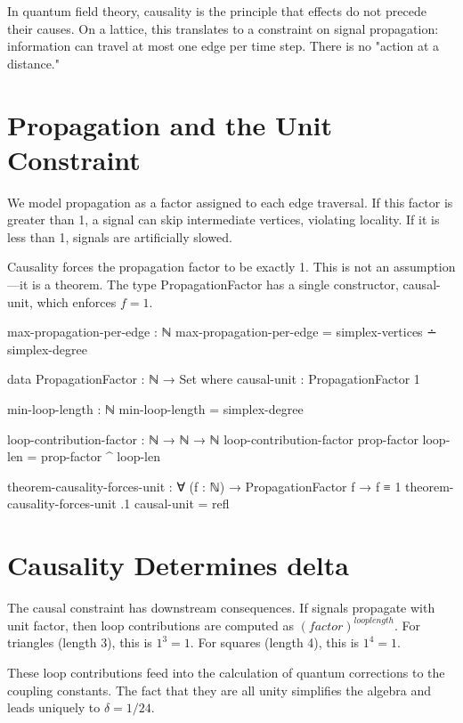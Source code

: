 \documentclass[11pt,a4paper]{book}
\def\texttt#1{#1}%
\def\text#1{#1}%
\def\texorpdfstring#1#2{#2}%
\begin{document}
In quantum field theory, causality is the principle that effects do not precede their causes. 
On a lattice, this translates to a constraint on signal propagation: information can travel 
at most one edge per time step. There is no "action at a distance."

\section{Propagation and the Unit Constraint}

We model propagation as a factor assigned to each edge traversal. If this factor is greater 
than 1, a signal can skip intermediate vertices, violating locality. If it is less than 1, 
signals are artificially slowed.

Causality forces the propagation factor to be exactly 1. This is not an assumption—it is a 
theorem. The type \texttt{PropagationFactor} has a single constructor, \texttt{causal-unit}, 
which enforces $f = 1$.

\begin{code}
max-propagation-per-edge : ℕ
max-propagation-per-edge = simplex-vertices ∸ simplex-degree

data PropagationFactor : ℕ → Set where
  causal-unit : PropagationFactor 1

min-loop-length : ℕ
min-loop-length = simplex-degree

loop-contribution-factor : ℕ → ℕ → ℕ
loop-contribution-factor prop-factor loop-len = prop-factor ^ loop-len

theorem-causality-forces-unit : ∀ (f : ℕ) → 
  PropagationFactor f → f ≡ 1
theorem-causality-forces-unit .1 causal-unit = refl
\end{code}

\section{Causality Determines \texorpdfstring{$\delta$}{delta}}

The causal constraint has downstream consequences. If signals propagate with unit factor, 
then loop contributions are computed as $(\text{factor})^{\text{loop length}}$. For triangles 
(length 3), this is $1^3 = 1$. For squares (length 4), this is $1^4 = 1$.

These loop contributions feed into the calculation of quantum corrections to the coupling 
constants. The fact that they are all unity simplifies the algebra and leads uniquely to 
$\delta = 1/24$.
\end{document}
